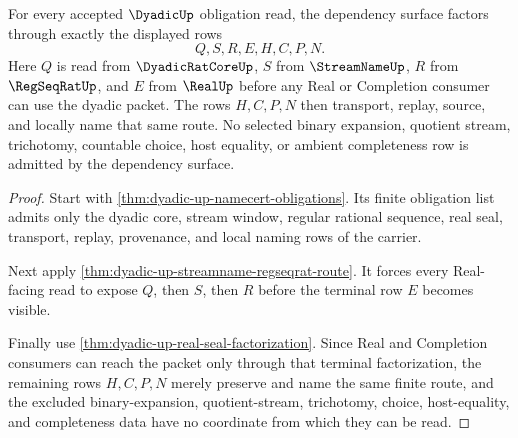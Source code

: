 \begin{theorem}
\label{thm:dyadic-up-obligation-closure-dependency-surface}
For every accepted $\DyadicUp$ obligation read, the dependency surface factors through exactly the displayed rows
$$
Q,S,R,E,H,C,P,N .
$$
Here $Q$ is read from $\DyadicRatCoreUp$, $S$ from $\StreamNameUp$, $R$ from $\RegSeqRatUp$, and $E$ from $\RealUp$ before any Real or Completion consumer can use the dyadic packet. The rows $H,C,P,N$ then transport, replay, source, and locally name that same route. No selected binary expansion, quotient stream, trichotomy, countable choice, host equality, or ambient completeness row is admitted by the dependency surface.
\end{theorem}
\begin{proof}
Start with \autoref{thm:dyadic-up-namecert-obligations}. Its finite obligation list admits only the dyadic core, stream window, regular rational sequence, real seal, transport, replay, provenance, and local naming rows of the carrier.

Next apply \autoref{thm:dyadic-up-streamname-regseqrat-route}. It forces every Real-facing read to expose $Q$, then $S$, then $R$ before the terminal row $E$ becomes visible.

Finally use \autoref{thm:dyadic-up-real-seal-factorization}. Since Real and Completion consumers can reach the packet only through that terminal factorization, the remaining rows $H,C,P,N$ merely preserve and name the same finite route, and the excluded binary-expansion, quotient-stream, trichotomy, choice, host-equality, and completeness data have no coordinate from which they can be read.
\end{proof}

